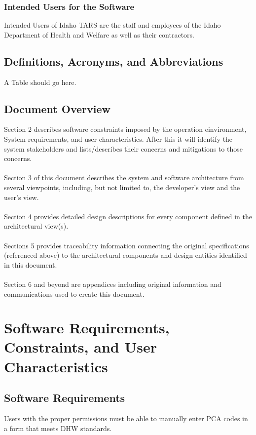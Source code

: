 \documentclass[letterpaper]{article}
\begin{document}
\subsubsection{Intended Users for the Software}
Intended Users of Idaho TARS are the staff and employees of the Idaho Department of Health and Welfare as well as their contractors.


\subsection{\bfseries{Definitions, Acronyms, and Abbreviations}}
A Table should go here. 

\subsection{\bfseries{Document Overview}}
Section 2 describes software constraints imposed by the operation einvironment, System requirements, and user characteristics. After this it will identify the system stakeholders and lists/describes their concerns and mitigations to those concerns. \\
\\
Section 3 of this document describes the system and software
architecture from several viewpoints, including, but not limited to,
the developer{\textquoteright}s view and the user{\textquoteright}s
view.\\
\\
Section 4 provides detailed design descriptions for every component
defined in the architectural view(s). \\
\\
Sections 5 provides traceability information connecting the original specifications
(referenced above) to the architectural components and design entities identified in this document.\\
\\
Section 6 and beyond are appendices including original information and communications used to create this document.
\section{\bfseries{Software Requirements, Constraints, and User Characteristics}}
\subsection{Software Requirements}
 
Users with the proper permissions must be able to manually enter PCA codes in a form that meets DHW standards.
\end{document}
